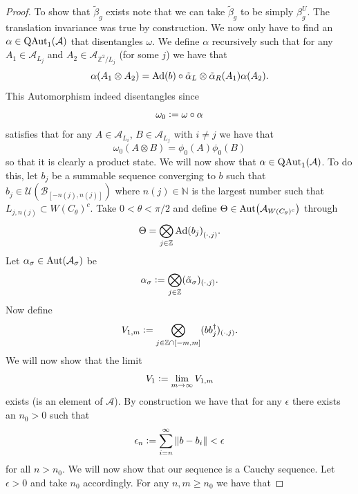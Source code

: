\documentclass[12pt,a4paper,twoside]{article}
\newcommand{\defeq}{\vcentcolon=}
\let\originalleft\left
\let\originalright\right
\renewcommand{\left}{\mathopen{}\mathclose\bgroup\originalleft}
\renewcommand{\right}{\aftergroup\egroup\originalright}
\newcommand{\UU}{\mathcal U}
\newcommand{\BB}{\mathcal B}
\newcommand{\ZZ}{\mathbb Z}
\renewcommand{\AA}{\mathcal A}
\newcommand{\NN}{\mathbb{N}}
\newcommand{\Ad}[1]{\textrm{Ad}\left(#1\right)}
\newcommand{\Aut}[1]{\textrm{Aut}\left(#1\right)}
\newcommand{\QAut}[1]{\textrm{QAut}_1\left(#1\right)}
\theoremstyle{definition}
\numberwithin{equation}{section}
\begin{document}
\begin{proof}
	To show that $\tilde{\beta}_g$ exists note that we can take $\tilde{\beta}_g$ to be simply $\beta_g^{U}$. The translation invariance was true by construction. We now only have to find an $\alpha\in\QAut{\AA}$ that disentangles $\omega$. We define $\alpha$ recursively such that for any $A_{1}\in\AA_{L_j}$ and $A_{2}\in\AA_{\ZZ^2/L_j}$ (for some $j$) we have that
	\begin{equation}
		\alpha(A_1\otimes A_2)=\Ad{b}\circ\tilde{\alpha}_L\otimes\tilde{\alpha}_R(A_1)\alpha(A_2).
	\end{equation}
	This Automorphism indeed disentangles since
	\begin{equation}
		\omega_0\defeq \omega\circ\alpha
	\end{equation}
	satisfies that for any $A\in\AA_{L_{i}}$, $B\in\AA_{L_{j}}$ with $i\neq j$ we have that
	\begin{equation}
		\omega_0(A\otimes B)=\phi_0(A)\phi_0(B)
	\end{equation}
	so that it is clearly a product state. We will now show that $\alpha\in\QAut{\AA}$. To do this, let $b_j$ be a summable sequence converging to $b$ such that $b_j\in\UU(\BB_{[-n(j),n(j)]})$ where $n(j)\in\NN$ is the largest number such that $L_{j,n(j)}\subset W(C_\theta)^c$. Take $0<\theta<\pi/2$ and define $\Theta\in\Aut{\AA_{W(C_\theta)^c}}$ through
	\begin{equation}
		\Theta=\bigotimes_{j\in\ZZ}\Ad{b_j}_{(\cdot,j)}.
	\end{equation}
	Let $\alpha_\sigma\in\Aut{\AA_\sigma}$ be
	\begin{equation}
		\alpha_\sigma\defeq \bigotimes_{j\in\ZZ}(\tilde\alpha_\sigma)_{(\cdot,j)}.
	\end{equation}
	Now define
	\begin{equation}
		V_{1,m}\defeq\bigotimes_{j\in\ZZ\cap[-m,m]}(bb_j^\dagger)_{(\cdot,j)}.
	\end{equation}
	We will now show that the limit
	\begin{equation}
		V_1\defeq\lim_{m\rightarrow\infty}V_{1,m}
	\end{equation}
	exists (is an element of $\AA$). By construction we have that for any $\epsilon$ there exists an $n_0>0$ such that
	\begin{equation}
		\epsilon_n\defeq\sum_{i=n}^\infty\norm{b-b_i}<\epsilon
	\end{equation}
	for all $n>n_0$. We will now show that our sequence is a Cauchy sequence. Let $\epsilon>0$ and take $n_0$ accordingly. For any $n,m\geq n_0$ we have that

\end{proof}
\end{document}

